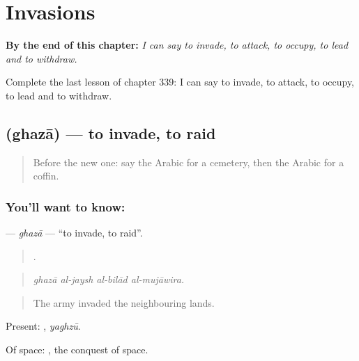 
\chapter{Invasions}
\label{ch:ar-invasions}

\begin{chapteropening}
\textbf{By the end of this chapter:} \emph{I can say to invade, to attack, to occupy, to lead and to withdraw.}

Complete the last lesson of chapter 339: I can say to invade, to attack, to occupy, to lead and to withdraw.
\end{chapteropening}

\section[\texorpdfstring{\ar{غزا} (ghazā)}{غزا (ghazā)}]{ (ghazā) — to invade, to raid}

\label{lesson:AR-C339-ghaza}



\begin{quote}
Before the new one: say the Arabic for a cemetery, then the Arabic for a coffin.
\end{quote}

\subsection*{You'll want to know: }
\textbf{} — \emph{ghazā} — \textquotedblleft{}to invade, to raid\textquotedblright{}.

\begin{quote}
   .
\end{quote}

\begin{quote}
\emph{ghazā al-jaysh al-bilād al-mujāwira.}
\end{quote}

\begin{quote}
The army invaded the neighbouring lands.
\end{quote}

Present: , \emph{yaghzū}.

Of space:  , the conquest of space.

